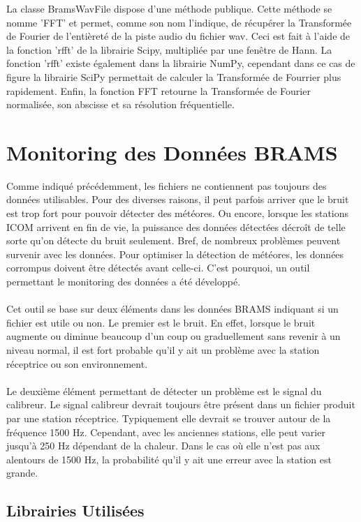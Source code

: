 \documentclass[11pt]{article}
\begin{document}
La classe BramsWavFile dispose d'une méthode publique.
Cette méthode se nomme 'FFT' et permet, comme son nom l'indique, de récupérer la Transformée de Fourier de l'entièreté de la piste audio du fichier wav.
Ceci est fait à l'aide de la fonction 'rfft' de la librairie Scipy, multipliée par une fenêtre de Hann.
La fonction 'rfft' existe également dans la librairie NumPy, cependant dans ce cas de figure la librairie SciPy permettait de calculer la Transformée de Fourrier plus rapidement.
Enfin, la fonction FFT retourne la Transformée de Fourier normalisée, son abscisse et sa résolution fréquentielle.

\newpage

\section{Monitoring des Données BRAMS}

Comme indiqué précédemment, les fichiers ne contiennent pas toujours des données utilisables.
Pour des diverses raisons, il peut parfois arriver que le bruit est trop fort pour pouvoir détecter des météores.
Ou encore, lorsque les stations ICOM arrivent en fin de vie, la puissance des données détectées décroît de telle sorte qu'on détecte du bruit seulement.
Bref, de nombreux problèmes peuvent survenir avec les données.
Pour optimiser la détection de météores, les données corrompus doivent être détectés avant celle-ci.
C'est pourquoi, un outil permettant le monitoring des données a été développé.\\
\\
Cet outil se base sur deux éléments dans les données BRAMS indiquant si un fichier est utile ou non.
Le premier est le bruit.
En effet, lorsque le bruit augmente ou diminue beaucoup d'un coup ou graduellement sans revenir à un niveau normal, il est fort probable qu'il y ait un problème avec la station réceptrice ou son environnement.\\
\\
Le deuxième élément permettant de détecter un problème est le signal du calibreur.
Le signal calibreur devrait toujours être présent dans un fichier produit par une station réceptrice.
Typiquement elle devrait se trouver autour de la fréquence 1500 Hz.
Cependant, avec les anciennes stations, elle peut varier jusqu'à 250 Hz dépendant de la chaleur.
Dans le cas où elle n'est pas aux alentours de 1500 Hz, la probabilité qu'il y ait une erreur avec la station est grande.

\subsection{Librairies Utilisées}
\end{document}
